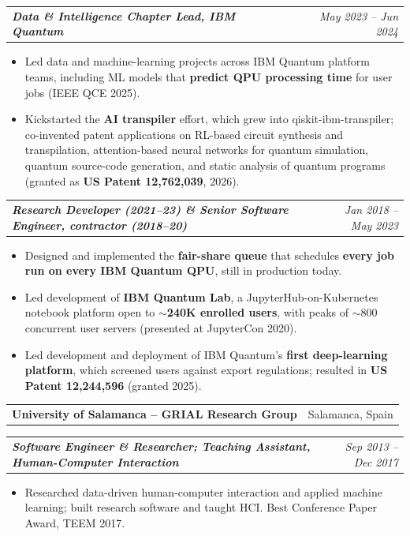 \documentclass[a4paper,10pt]{article}
\makeatletter
\newcommand{\employer}[2]{%
  \begin{tabularx}{\linewidth}{@{}X r@{}}
    {\headfont\bfseries\large #1} & \footnotesize #2
  \end{tabularx}\par\vspace{0.6mm}}
\newcommand{\role}[2]{%
  \begin{tabularx}{\linewidth}{@{}X r@{}}
    \textbf{\textit{#1}} & \textit{\footnotesize #2}
  \end{tabularx}\par}
\newenvironment{bullets}
  {\begin{justify}\begin{itemize}[leftmargin=3ex, rightmargin=0.5ex, noitemsep, topsep=0.8mm, labelsep=1.2mm]\small}
  {\end{itemize}\end{justify}\vspace{1.2mm}}
\makeatother
\begin{document}
\role{Data \& Intelligence Chapter Lead, IBM Quantum}{May 2023 -- Jun 2024}
\begin{bullets}
  \item Led data and machine-learning projects across IBM Quantum platform teams, including ML models that \textbf{predict QPU processing time} for user jobs (IEEE QCE 2025).
  \item Kickstarted the \textbf{AI transpiler} effort, which grew into qiskit-ibm-transpiler; co-invented patent applications on RL-based circuit synthesis and transpilation, attention-based neural networks for quantum simulation, quantum source-code generation, and static analysis of quantum programs (granted as \textbf{US Patent 12,762,039}, 2026).
\end{bullets}

\role{Research Developer \textnormal{(2021--23)} \& Senior Software Engineer, contractor \textnormal{(2018--20)}}{Jan 2018 -- May 2023}
\begin{bullets}
  \item Designed and implemented the \textbf{fair-share queue} that schedules \textbf{every job run on every IBM Quantum QPU}, still in production today.
  \item Led development of \textbf{IBM Quantum Lab}, a JupyterHub-on-Kubernetes notebook platform open to \textbf{$\sim$240K enrolled users}, with peaks of $\sim$800 concurrent user servers (presented at JupyterCon 2020).
  \item Led development and deployment of IBM Quantum's \textbf{first deep-learning platform}, which screened users against export regulations; resulted in \textbf{US Patent 12,244,596} (granted 2025).
\end{bullets}

\vspace{0.5mm}
\employer{University of Salamanca -- GRIAL Research Group}{Salamanca, Spain}
\role{Software Engineer \& Researcher; Teaching Assistant, Human-Computer Interaction}{Sep 2013 -- Dec 2017}
\begin{bullets}
  \item Researched data-driven human-computer interaction and applied machine learning; built research software and taught HCI. Best Conference Paper Award, TEEM 2017.
\end{bullets}
\end{document}
